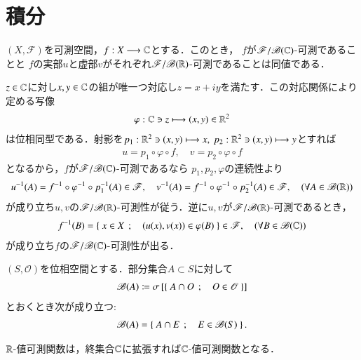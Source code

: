 \section{積分}
	\begin{screen}
		\begin{thm}[複素数値関数の可測性]\label{thm:measurability_of_complex_measurable_functions}
			$(X,\mathscr{F})$を可測空間，$f:X \longrightarrow \mathbb{C}$とする．このとき，
			$f$が$\mathscr{F}/\mathscr{B}(\mathbb{C})$-可測であることと
			$f$の実部$u$と虚部$v$がそれぞれ$\mathscr{F}/\mathscr{B}(\mathbb{R})$-可測であることは同値である．
		\end{thm}
	\end{screen}
	
	\begin{prf}
		$z \in \mathbb{C}$に対し$x,y \in \mathbb{C}$の組が唯一つ対応し$z = x + i y$を満たす．この対応関係により定める写像
		\begin{align}
			\varphi:\mathbb{C} \ni z \longmapsto (x,y) \in \mathbb{R}^2
		\end{align}
		は位相同型である．射影を$p_1:\mathbb{R}^2 \ni (x,y) \longmapsto x,
		\ p_2:\mathbb{R}^2 \ni (x,y) \longmapsto y$とすれば
		\begin{align}
			u = p_1 \circ \varphi \circ f,
			\quad v = p_2 \circ \varphi \circ f
		\end{align}
		となるから，$f$が$\mathscr{F}/\mathscr{B}(\mathbb{C})$-可測であるなら
		$p_1,p_2,\varphi$の連続性より
		\begin{align}
			u^{-1}(A) = f^{-1} \circ \varphi^{-1} \circ p_1^{-1}(A) \in \mathscr{F},
			\quad v^{-1}(A) = f^{-1} \circ \varphi^{-1} \circ p_2^{-1}(A) \in \mathscr{F},
			\quad (\forall A \in \mathscr{B}(\mathbb{R}))
		\end{align}
		が成り立ち$u,v$の$\mathscr{F}/\mathscr{B}(\mathbb{R})$-可測性が従う．逆に$u,v$が$\mathscr{F}/\mathscr{B}(\mathbb{R})$-可測であるとき，
		\begin{align}
			f^{-1}(B) = \left\{\ x \in X\ \, ; \quad (u(x),v(x)) \in \varphi(B)\ \right\} \in \mathscr{F},
			\quad (\forall B \in \mathscr{B}(\mathbb{C}))
		\end{align}
		が成り立ち$f$の$\mathscr{F}/\mathscr{B}(\mathbb{C})$-可測性が出る．
		\QED
	\end{prf}
	
	\begin{screen}
		\begin{thm}[和・積・商の可測性]
			
		\end{thm}
	\end{screen}
	
	\begin{screen}
		\begin{thm}[相対位相のBorel集合族]
			$(S,\mathscr{O})$を位相空間とする．部分集合$A \subset S$に対して
			\begin{align}
				\mathscr{B}(A) \coloneqq \sigma\left[ \left\{\ A \cap O\ \, ; \quad O \in \mathscr{O}\ \right\} \right]
			\end{align}
			とおくとき次が成り立つ:
			\begin{align}
				\mathscr{B}(A) = \left\{\ A \cap E\ \, ; \quad E \in \mathscr{B}(S)\ \right\}.
			\end{align}
		\end{thm}
	\end{screen}
	$\mathbb{R}$-値可測関数は，終集合$\mathbb{C}$に拡張すれば$\mathbb{C}$-値可測関数となる．
	
